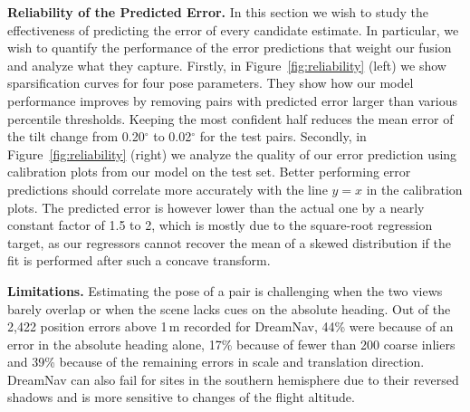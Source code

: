 \noindent \textbf{Reliability of the Predicted Error.} In this section we wish to study the effectiveness of predicting the error of every candidate estimate. In particular, we wish to quantify the performance of the error predictions that weight our fusion and analyze what they capture. Firstly, in Figure~\ref{fig:reliability} (left) we show sparsification curves for four pose parameters. They show how our model performance improves by removing pairs with predicted error larger than various percentile thresholds. Keeping the most confident half reduces the mean error of the tilt change from 0.20$^\circ$ to 0.02$^\circ$ for the test pairs. Secondly, in Figure~\ref{fig:reliability} (right) we analyze the quality of our error prediction using calibration plots from our model on the test set. Better performing error predictions should correlate more accurately with the line $y=x$ in the calibration plots. The predicted error is however lower than the actual one by a nearly constant factor of 1.5 to 2, which is mostly due to the square-root regression target, as our regressors cannot recover the mean of a skewed distribution if the fit is performed after such a concave transform.

\noindent \textbf{Limitations.} Estimating the pose of a pair is challenging when the two views barely overlap or when the scene lacks cues on the absolute heading. Out of the 2,422 position errors above 1\,m recorded for DreamNav, 44\% were because of an error in the absolute heading alone, 17\% because of fewer than 200 coarse inliers and 39\% because of the remaining errors in scale and translation direction. DreamNav can also fail for sites in the southern hemisphere due to their reversed shadows and is more sensitive to changes of the flight altitude.

